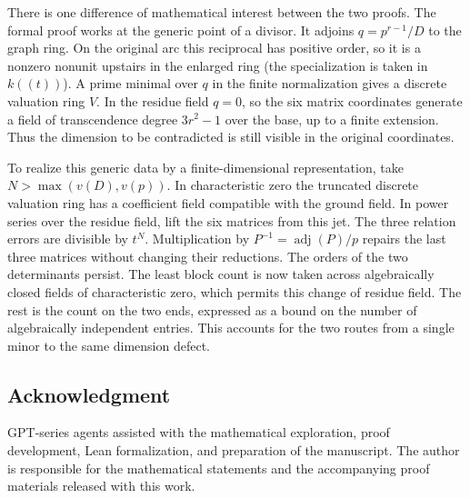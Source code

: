 \documentclass[11pt,reqno]{amsart}
\theoremstyle{definition}
\begin{document}
There is one difference of mathematical interest between the two proofs.
The formal proof works at the generic point of a divisor. It adjoins
\(q=p^{r-1}/D\) to the graph ring. On the original arc this reciprocal
has positive order, so it is a nonzero nonunit upstairs in the enlarged
ring (the specialization is taken in \(k((t))\)). A prime minimal over
\(q\) in the finite normalization gives a discrete valuation ring \(V\).
In the residue field \(q=0\), so the six matrix coordinates generate a
field of transcendence degree \(3r^2-1\) over the base, up to a finite
extension. Thus the dimension to be contradicted is still visible in
the original coordinates.

To realize this generic data by a finite-dimensional representation, take
\(N>\max(v(D),v(p))\). In characteristic zero the truncated discrete
valuation ring has a coefficient field compatible with the ground field.
In power series over the residue field, lift the six matrices from this
jet. The three relation errors are divisible by \(t^N\). Multiplication
by \(P^{-1}=\operatorname{adj}(P)/p\) repairs the last three matrices
without changing their reductions. The orders of the two determinants
persist. The least block count is now taken across algebraically closed
fields of characteristic zero, which permits this change of residue
field. The rest is the count on the two ends, expressed as a bound on
the number of algebraically independent entries. This accounts for the
two routes from a single minor to the same dimension defect.

\subsection*{Acknowledgment}
GPT-series agents assisted with the mathematical exploration, proof
development, Lean formalization, and preparation of the manuscript.
The author is responsible for the mathematical statements and the
accompanying proof materials released with this work.
\end{document}
